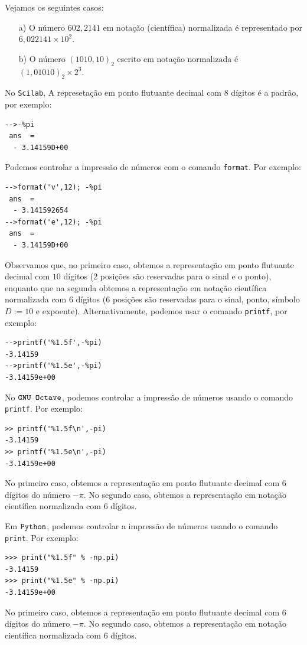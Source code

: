 \begin{ex} Vejamos os seguintes casos:
  \begin{itemize}
  \item[a)] O número $602,2141$ em notação (científica) normalizada é representado por $6,022141\times 10^{2}$.
  \item[b)] O número $(1010,10)_2$ escrito em notação normalizada é $(1,01010)_2\times 2^3$.
  \end{itemize}
\end{ex}

\ifisscilab
\begin{obs}
No \verb+Scilab+, A represetação em ponto flutuante decimal com $8$ dígitos é a padrão, por exemplo:
\begin{verbatim}
-->-%pi
 ans  =
  - 3.14159D+00 
\end{verbatim}
Podemos controlar a impressão de números com o comando \verb+format+. Por exemplo:
\begin{verbatim}
-->format('v',12); -%pi
 ans  =
  - 3.141592654  
-->format('e',12); -%pi
 ans  =
  - 3.14159D+00  
\end{verbatim}
Observamos que, no primeiro caso, obtemos a representação em ponto flutuante decimal com $10$ dígitos ($2$ posições são reservadas para o sinal e o ponto), enquanto que na segunda obtemos a representação em notação científica normalizada com $6$ dígitos ($6$ posições são reservadas para o sinal, ponto, símbolo $D := 10$ e expoente). Alternativamente, podemos usar o comando \verb+printf+, por exemplo:
\begin{verbatim}
-->printf('%1.5f',-%pi)
-3.14159 
-->printf('%1.5e',-%pi)
-3.14159e+00 
\end{verbatim}
\end{obs}
\fi
\ifisoctave
\begin{obs}
No $\verb+GNU Octave+$, podemos controlar a impressão de números usando o comando \verb+printf+. Por exemplo:
\begin{verbatim}
>> printf('%1.5f\n',-pi)
-3.14159
>> printf('%1.5e\n',-pi)
-3.14159e+00
\end{verbatim}
No primeiro caso, obtemos a representação em ponto flutuante decimal com $6$ dígitos do número $-\pi$. No segundo caso, obtemos a representação em notação científica normalizada com $6$ dígitos.  
\end{obs}
\fi
\ifispython
\begin{obs}
Em $\verb+Python+$, podemos controlar a impressão de números usando o comando \verb+print+. Por exemplo:
\begin{verbatim}
>>> print("%1.5f" % -np.pi)
-3.14159
>>> print("%1.5e" % -np.pi)
-3.14159e+00
\end{verbatim}
No primeiro caso, obtemos a representação em ponto flutuante decimal com $6$ dígitos do número $-\pi$. No segundo caso, obtemos a representação em notação científica normalizada com $6$ dígitos.  
\end{obs}
\fi

